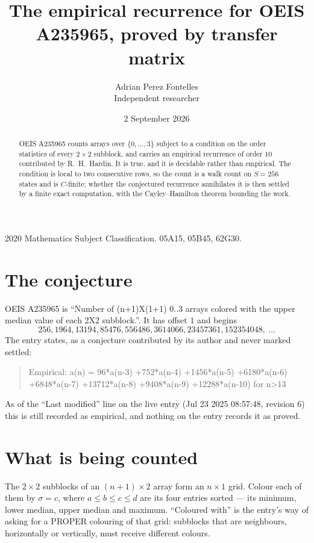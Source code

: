 \documentclass[11pt,a4paper]{article}
\title{The empirical recurrence for OEIS A235965, proved by transfer matrix}
\author{Adrian Perez Fontelles\\ \small Independent researcher}
\date{2 September 2026}
\theoremstyle{plain}
\theoremstyle{definition}
\begin{document}
\maketitle

\begin{abstract}
OEIS A235965 counts arrays over $\{0,\dots,3\}$ subject to a condition on the order
statistics of every $2\times2$ subblock, and carries an empirical recurrence of order
$10$ contributed by R.~H.~Hardin. It is true, and it is decidable rather than empirical.
The condition is local to two consecutive rows, so the count is a walk count on $S=256$
states and is $C$-finite; whether the conjectured recurrence annihilates it is then settled by
a finite exact computation, with the Cayley--Hamilton theorem bounding the work.
\end{abstract}

\noindent\small 2020 Mathematics Subject Classification. 05A15, 05B45, 62G30.\normalsize

\section{The conjecture}

OEIS A235965 is ``Number of (n+1)X(1+1) 0..3 arrays colored with the upper median value of each 2X2 subblock.''. It has offset $1$ and begins
\[
256, 1964, 13194, 85476, 556486, 3614066, 23457361, 152354048,\ \dots
\]
The entry states, as a conjecture contributed by its author and never marked settled:
\begin{quote}
Empirical: a(n) = 96*a(n-3) +752*a(n-4) +1456*a(n-5) +6180*a(n-6) +6848*a(n-7) +13712*a(n-8) +9408*a(n-9) +12288*a(n-10) for n>13
\end{quote}
As of the ``Last modified'' line on the live entry (Jul 23 2025 08:57:48, revision 6) this is still
recorded as empirical, and nothing on the entry records it as proved.

\section{What is being counted}

The $2\times2$ subblocks of an $(n+1)\times2$ array form an
$n\times1$ grid. Colour each of them by $\sigma=c$, where $a\le b\le c\le d$ are its four entries sorted --- its minimum, lower median, upper median and maximum. ``Coloured with'' is the entry's way of
asking for a PROPER colouring of that grid: subblocks that are neighbours, horizontally or
vertically, must receive different colours.
\end{document}
